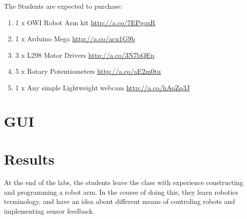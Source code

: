 The Students are expected to purchase:
\begin{enumerate}
\item 1 x OWI Robot Arm kit \url{http://a.co/7EPgoxR}
\item 1 x Arduino Mega \url{http://a.co/acu1G9b}
\item 3 x L298 Motor Drivers \url{http://a.co/3N7bQEp}
\item 5 x Rotary Potentiometers \url{http://a.co/aE2m0tu}
\item 1 x Any simple Lightweight webcam \url{http://a.co/hAqZq3J}
\end{enumerate}

\section {GUI}





\section{Results}

At the end of the labs, the students leave the class with experience constructing and programming a robot arm. In the course of doing this, they learn robotics terminology, and have an idea about different means of controling robots and implementing sensor feedback. 
